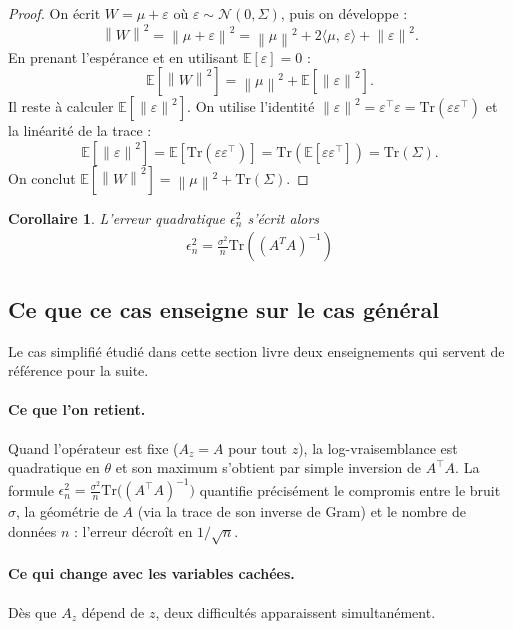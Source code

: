 \documentclass[12pt, a4paper]{article}
\newtheorem{corollary}[theorem]{Corollaire}
\theoremstyle{definition}
\newcommand{\E}{\mathbb{E}}
\newcommand{\Ncal}{\mathcal{N}}
\newcommand{\norm}[1]{\left\|#1\right\|}
\newcommand{\inner}[2]{\langle #1,\, #2 \rangle}
\newcommand{\Tr}{\mathrm{Tr}}
\begin{document}
\begin{proof}
On écrit $W = \mu + \varepsilon$ où $\varepsilon \sim \Ncal(0, \Sigma)$, puis on
développe :
\[
    \norm{W}^2
    = \norm{\mu + \varepsilon}^2
    = \norm{\mu}^2 + 2\inner{\mu}{\varepsilon} + \norm{\varepsilon}^2.
\]
En prenant l'espérance et en utilisant $\E[\varepsilon] = 0$ :
\[
    \E\!\left[\norm{W}^2\right]
    = \norm{\mu}^2 + \E\!\left[\norm{\varepsilon}^2\right].
\]
Il reste à calculer $\E[\norm{\varepsilon}^2]$. On utilise l'identité
$\norm{\varepsilon}^2 = \varepsilon^\top\varepsilon = \Tr(\varepsilon\varepsilon^\top)$
et la linéarité de la trace :
\[
    \E\!\left[\norm{\varepsilon}^2\right]
    = \E\!\left[\Tr(\varepsilon\varepsilon^\top)\right]
    = \Tr\!\left(\E[\varepsilon\varepsilon^\top]\right)
    = \Tr(\Sigma).
\]
On conclut $\E[\norm{W}^2] = \norm{\mu}^2 + \Tr(\Sigma)$.
\end{proof}

\begin{corollary}
L'erreur quadratique $\epsilon_n^2$ s'écrit alors
\begin{align*}
    \epsilon_n^2 = \frac{\sigma^2}{n} \Tr((A^TA)^{-1})
\end{align*}
\end{corollary}


\subsection{Ce que ce cas enseigne sur le cas général}
\label{subsec:lecons}

Le cas simplifié étudié dans cette section livre deux enseignements qui servent
de référence pour la suite.

\paragraph{Ce que l'on retient.}
Quand l'opérateur est fixe ($A_z = A$ pour tout $z$), la log-vraisemblance est
quadratique en $\theta$ et son maximum s'obtient par simple inversion de
$A^\top A$. La formule $\epsilon_n^2 = \frac{\sigma^2}{n}\Tr\bigl((A^\top A)^{-1}\bigr)$
quantifie précisément le compromis entre le bruit $\sigma$, la géométrie de $A$
(via la trace de son inverse de Gram) et le nombre de données $n$ : l'erreur
décroît en $1/\sqrt{n}$.

\paragraph{Ce qui change avec les variables cachées.}
Dès que $A_z$ dépend de $z$, deux difficultés apparaissent simultanément.
\end{document}
